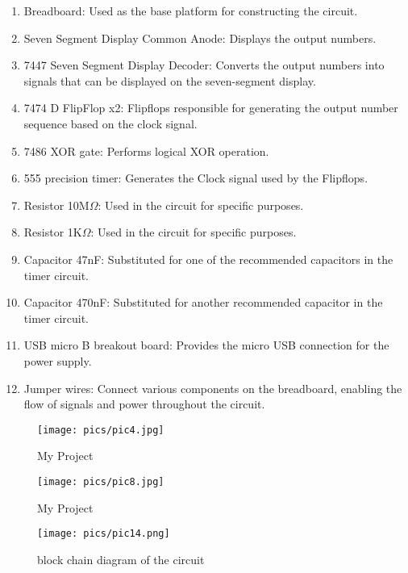 \documentclass[journal,12pt,twocolumn]{IEEEtran}
\begin{document}
\begin{enumerate}
  \item Breadboard: Used as the base platform for constructing the circuit.
  \item Seven Segment Display Common Anode: Displays the output numbers.
  \item 7447 Seven Segment Display Decoder: Converts the output numbers into signals that can be displayed on the seven-segment display.
  \item 7474 D FlipFlop x2: Flipflops responsible for generating the output number sequence based on the clock signal.
  \item 7486 XOR gate: Performs logical XOR operation.
  \item 555 precision timer: Generates the Clock signal used by the Flipflops.
  \item Resistor 10M$\Omega$: Used in the circuit for specific purposes.
  \item Resistor 1K$\Omega$: Used in the circuit for specific purposes.
  \item Capacitor 47nF: Substituted for one of the recommended capacitors in the timer circuit.
  \item Capacitor 470nF: Substituted for another recommended capacitor in the timer circuit.
  \item USB micro B breakout board: Provides the micro USB connection for the power supply.
  \item Jumper wires: Connect various components on the breadboard, enabling the flow of signals and power throughout the circuit.
\end{enumerate}


\begin{figure}[h]
    \begin{center}
    \texttt{[image: pics/pic4.jpg]}
    \caption{My Project}
    \end{center}
    \label{fig:my_label} 
\end{figure}

\begin{figure}[h]
    \centering
    \texttt{[image: pics/pic8.jpg]}
    \caption{My Project}
    \label{fig:my_label} 
\end{figure}

\begin{figure}[h]
    \centering
    \texttt{[image: pics/pic14.png]}
    \caption{block chain diagram of the circuit}
    \label{fig:my_label} 
\end{figure}
         
\end{document}
